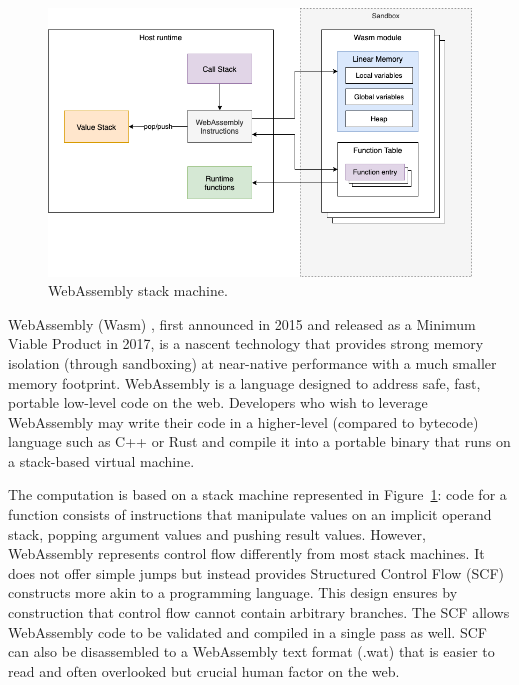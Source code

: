 \begin{figure}[ht]
\centering
\includegraphics[width=\columnwidth]{figures/webassembly}
\caption{WebAssembly stack machine.} \label{fig:webassembly}
\end{figure}

WebAssembly (Wasm) \cite{haas2017bringing}, first announced in 2015 and released as a Minimum Viable Product in 2017, is a nascent technology that provides strong memory isolation (through sandboxing) at near-native performance with a much smaller memory footprint. WebAssembly is a language designed to address safe, fast, portable low-level code on the web. Developers who wish to leverage WebAssembly may write their code in a higher-level (compared to bytecode) language such as C++ or Rust and compile it into a portable binary that runs on a stack-based virtual machine.



The computation is based on a stack machine represented in Figure~\ref{fig:webassembly}: code for a function consists of instructions that manipulate values on an implicit operand stack, popping argument values and pushing result values. However, WebAssembly represents control flow differently from most stack machines. It does not offer simple jumps but instead provides Structured Control Flow (SCF) constructs more akin to a programming language. This design ensures by construction that control flow cannot contain arbitrary branches. The SCF allows WebAssembly code to be validated and compiled in a single pass as well. SCF can also be disassembled to a WebAssembly text format (.wat) that is easier to read and often overlooked but crucial human factor on the web.

